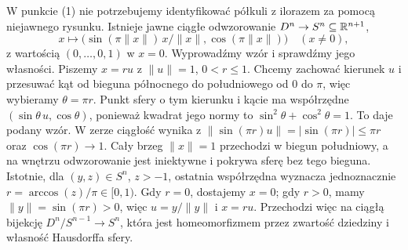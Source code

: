 \begin{uwaga}
W punkcie (1) nie potrzebujemy
identyfikować półkuli z ilorazem
za pomocą niejawnego rysunku.
Istnieje jawne ciągłe odwzorowanie
$D^n\to S^n\subseteq\mathbb{R}^{n+1}$,
\[
 x\longmapsto
 \bigl(\sin(\pi\|x\|)\,x/\|x\|,
       \cos(\pi\|x\|)\bigr)
 \quad(x\ne0),
\]
z wartością $(0,\ldots,0,1)$
w $x=0$. Wyprowadźmy wzór i sprawdźmy jego własności.
Piszemy $x=ru$ z $\|u\|=1$, $0<r\leq1$.
Chcemy zachować kierunek $u$ i przesuwać kąt od bieguna
północnego do południowego od $0$ do $\pi$, więc wybieramy
$\theta=\pi r$. Punkt sfery o tym kierunku i kącie ma
współrzędne $(\sin\theta\,u,\cos\theta)$, ponieważ
kwadrat jego normy to $\sin^2\theta+\cos^2\theta=1$.
To daje podany wzór. W zerze ciągłość wynika z
$\|\sin(\pi r)u\|=|\sin(\pi r)|\leq\pi r$ oraz $\cos(\pi r)\to1$.
Cały brzeg $\|x\|=1$
przechodzi w biegun południowy,
a na wnętrzu odwzorowanie jest iniektywne
i pokrywa sferę bez tego bieguna.
Istotnie, dla $(y,z)\in S^n$, $z>-1$,
ostatnia współrzędna wyznacza jednoznacznie
$r=\arccos(z)/\pi\in[0,1)$.
Gdy $r=0$, dostajemy $x=0$; gdy $r>0$, mamy
$\|y\|=\sin(\pi r)>0$, więc $u=y/\|y\|$ i $x=ru$.
Przechodzi więc na ciągłą bijekcję
$D^n/S^{n-1}\to S^n$, która jest
homeomorfizmem przez zwartość
dziedziny i własność Hausdorffa
sfery.
\end{uwaga}

